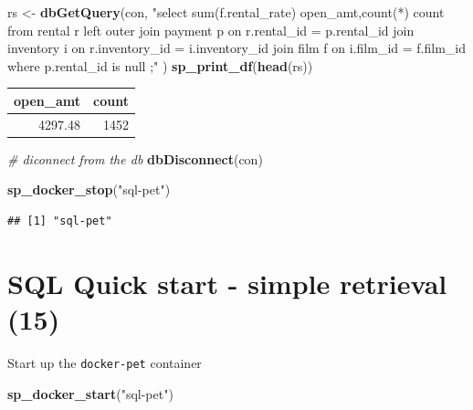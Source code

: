 \documentclass[]{book}
\newenvironment{Shaded}{\begin{snugshade}}{\end{snugshade}}
\newcommand{\CommentTok}[1]{\textcolor[rgb]{0.56,0.35,0.01}{\textit{#1}}}
\newcommand{\KeywordTok}[1]{\textcolor[rgb]{0.13,0.29,0.53}{\textbf{#1}}}
\newcommand{\NormalTok}[1]{#1}
\newcommand{\StringTok}[1]{\textcolor[rgb]{0.31,0.60,0.02}{#1}}
\theoremstyle{definition}
\theoremstyle{definition}
\theoremstyle{definition}
\theoremstyle{remark}
\begin{document}
\begin{Shaded}
\begin{Highlighting}[]
\NormalTok{rs <-}\StringTok{ }\KeywordTok{dbGetQuery}\NormalTok{(con,}
                \StringTok{"select sum(f.rental_rate) open_amt,count(*) count}
\StringTok{                   from rental r }
\StringTok{                        left outer join payment p }
\StringTok{                          on r.rental_id = p.rental_id  }
\StringTok{                        join inventory i}
\StringTok{                          on r.inventory_id = i.inventory_id}
\StringTok{                        join film f}
\StringTok{                          on i.film_id = f.film_id}
\StringTok{                  where p.rental_id is null}
\StringTok{                 ;"}
\NormalTok{                )  }
\KeywordTok{sp_print_df}\NormalTok{(}\KeywordTok{head}\NormalTok{(rs))}
\end{Highlighting}
\end{Shaded}

\begin{tabular}{r|r}
\hline
open\_amt & count\\
\hline
4297.48 & 1452\\
\hline
\end{tabular}

\begin{Shaded}
\begin{Highlighting}[]
\CommentTok{# diconnect from the db}
\KeywordTok{dbDisconnect}\NormalTok{(con)}

\KeywordTok{sp_docker_stop}\NormalTok{(}\StringTok{"sql-pet"}\NormalTok{)}
\end{Highlighting}
\end{Shaded}

\begin{verbatim}
## [1] "sql-pet"
\end{verbatim}

\hypertarget{sql-quick-start---simple-retrieval-15}{%
\chapter{SQL Quick start - simple retrieval
(15)}\label{sql-quick-start---simple-retrieval-15}}

Start up the \texttt{docker-pet} container

\begin{Shaded}
\begin{Highlighting}[]
\KeywordTok{sp_docker_start}\NormalTok{(}\StringTok{"sql-pet"}\NormalTok{)}
\end{Highlighting}
\end{Shaded}
\end{document}
